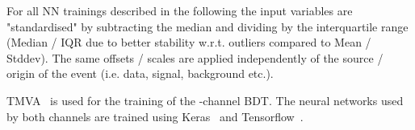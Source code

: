 For all NN trainings described in the following the input variables are "standardised" by subtracting the median and dividing by the interquartile range (Median / IQR due to better stability w.r.t. outliers compared to Mean / Stddev). The same offsets / scales are applied independently of the source / origin of the event (i.e. data, signal, background etc.).

TMVA~\cite{tmva} is used for the training of the \hadhad-channel
BDT. The neural networks used by both channels are trained using
Keras~\cite{keras} and Tensorflow~\cite{tensorflow}.


\label{sec:mva_hh}

%
